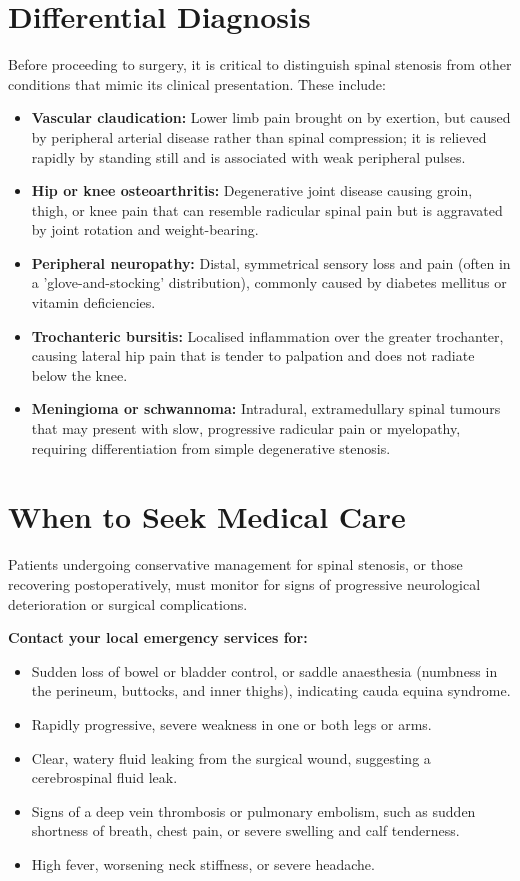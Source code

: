 \section*{Differential Diagnosis}
Before proceeding to surgery, it is critical to distinguish spinal stenosis from other conditions that mimic its clinical presentation. These include:

\begin{itemize}
    \item \textbf{Vascular claudication:} Lower limb pain brought on by exertion, but caused by peripheral arterial disease rather than spinal compression; it is relieved rapidly by standing still and is associated with weak peripheral pulses.
    \item \textbf{Hip or knee osteoarthritis:} Degenerative joint disease causing groin, thigh, or knee pain that can resemble radicular spinal pain but is aggravated by joint rotation and weight-bearing.
    \item \textbf{Peripheral neuropathy:} Distal, symmetrical sensory loss and pain (often in a 'glove-and-stocking' distribution), commonly caused by diabetes mellitus or vitamin deficiencies.
    \item \textbf{Trochanteric bursitis:} Localised inflammation over the greater trochanter, causing lateral hip pain that is tender to palpation and does not radiate below the knee.
    \item \textbf{Meningioma or schwannoma:} Intradural, extramedullary spinal tumours that may present with slow, progressive radicular pain or myelopathy, requiring differentiation from simple degenerative stenosis.
\end{itemize}

\section*{When to Seek Medical Care}
Patients undergoing conservative management for spinal stenosis, or those recovering postoperatively, must monitor for signs of progressive neurological deterioration or surgical complications.

\textbf{Contact your local emergency services for:}
\begin{itemize}
    \item Sudden loss of bowel or bladder control, or saddle anaesthesia (numbness in the perineum, buttocks, and inner thighs), indicating cauda equina syndrome.
    \item Rapidly progressive, severe weakness in one or both legs or arms.
    \item Clear, watery fluid leaking from the surgical wound, suggesting a cerebrospinal fluid leak.
    \item Signs of a deep vein thrombosis or pulmonary embolism, such as sudden shortness of breath, chest pain, or severe swelling and calf tenderness.
    \item High fever, worsening neck stiffness, or severe headache.
\end{itemize}

